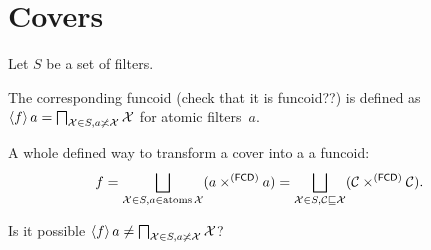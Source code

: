 \chapter{Covers}

Let $S$ be a set of filters.

The corresponding funcoid (check that it is funcoid??) is defined as
$\left\langle f\right\rangle a = \bigsqcap_{\mathcal{X}\in S, a\not\asymp\mathcal{X}}\mathcal{X}$
for atomic filters~$a$.

A whole defined way to transform a cover into a a funcoid:
\[ f=\bigsqcup_{\mathcal{X}\in S, a\in\atoms\mathcal{X}}(a\times^{\funcoids}a)=
\bigsqcup_{\mathcal{X}\in S, \mathcal{C}\sqsubseteq\mathcal{X}}(\mathcal{C}\times^{\funcoids}\mathcal{C}). \]

Is it possible $\left\langle f\right\rangle a \ne \bigsqcap_{\mathcal{X}\in S, a\not\asymp\mathcal{X}}\mathcal{X}$?
